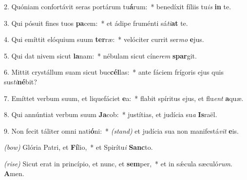 2. Quóniam confortávit seras portárum tu\textbf{á}rum:~* benedíxit fíliis tu\textit{is} \textbf{in} te.

3. Qui pósuit fines tuos \textbf{pa}cem:~* et ádipe fruménti sá\textit{ti}\textbf{at} te.

4. Qui emíttit elóquium suum \textbf{ter}ræ:~* velóciter currit ser\textit{mo} \textbf{e}jus.

5. Qui dat nivem sicut \textbf{la}nam:~* nébulam sicut cíne\textit{rem} \textbf{spar}git.

6. Mittit crystállum suam sicut buc\textbf{cél}las:~* ante fáciem frígoris ejus quis sus\textit{ti}\textbf{né}bit?

7. Emíttet verbum suum, et liquefáciet \textbf{e}a:~* flabit spíritus ejus, et flu\textit{ent} \textbf{a}quæ.

8. Qui annúntiat verbum suum \textbf{Ja}cob:~* justítias, et judícia su\textit{a} \textbf{Is}raël.

9. Non fecit táliter omni nati\textbf{ó}ni:~* {\color{red}\textit{(stand)}} et judícia sua non manifestá\textit{vit} \textbf{e}is.

{\color{red}\textit{(bow)}} Glória Patri, et \textbf{Fí}lio,~* et Spirítu\textit{i} \textbf{Sanc}to.

{\color{red}\textit{(rise)}} Sicut erat in princípio, et nunc, et \textbf{sem}per,~* et in s\'{\ae}cula sæculó\textit{rum}. \textbf{A}men.